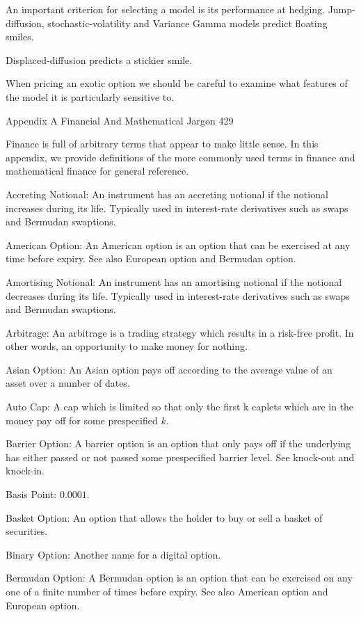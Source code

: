 An important criterion for selecting a model is its performance at hedging. Jump-diffusion, stochastic-volatility and Variance Gamma models predict floating smiles.

Displaced-diffusion predicts a stickier smile.

When pricing an exotic option we should be careful to examine what features of the model it is particularly sensitive to.

Appendix A Financial And Mathematical Jargon 429

Finance is full of arbitrary terms that appear to make little sense. In this appendix, we provide definitions of the more commonly used terms in finance and mathematical finance for general reference.

Accreting Notional: An instrument has an accreting notional if the notional increases during its life. Typically used in interest-rate derivatives such as swaps and Bermudan swaptions.

American Option: An American option is an option that can be exercised at any time before expiry. See also European option and Bermudan option. 

Amortising Notional: An instrument has an amortising notional if the notional decreases during its life. Typically used in interest-rate derivatives such as swaps and Bermudan swaptions.

Arbitrage: An arbitrage is a trading strategy which results in a risk-free profit. In other words, an opportunity to make money for nothing.

Asian Option: An Asian option pays off according to the average value of an
asset over a number of dates.

Auto Cap: A cap which is limited so that only the first k caplets which are in the money pay off for some prespecified $k$.

Barrier Option: A barrier option is an option that only pays off if the underlying has either passed or not passed some prespecified barrier level. See knock-out and knock-in.

Basis Point: $0.0001$.

Basket Option: An option that allows the holder to buy or sell a basket of securities.

Binary Option: Another name for a digital option.

Bermudan Option: A Bermudan option is an option that can be exercised on any one of a finite number of times before expiry. See also American option and European option.

